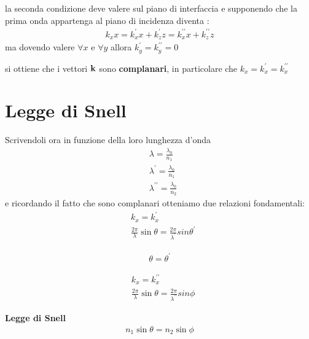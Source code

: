 la seconda condizione deve valere sul piano di interfaccia e supponendo che 
la prima onda appartenga al piano di incidenza diventa : 
\begin{align*}
        k_{x}x = k^{\prime}_{x}x + k^{\prime}_{z}z = k^{\prime\prime}_{x}x + k^{\prime\prime}_{z}z 
\end{align*}
ma dovendo valere $\forall{x}$ e $\forall{y}$ allora $k^{\prime}_{y} = k^{\prime\prime}_{y} = 0$
\begin{tcolorbox}[colback=red!5!white,colframe=red!50!black,title=ATTENZIONE !]
        si ottiene che i vettori $\vb{k}$ sono \textbf{complanari}, in particolare che 
        $k_{x} = k^{\prime}_{x} = k^{\prime\prime}_{x}$
\end{tcolorbox}
\section{Legge di Snell}
Scrivendoli ora in funzione della loro lunghezza d'onda
\begin{align*}
    &\lambda = \frac{\lambda_{0}}{n_{1}} \\
    &\lambda^{\prime} = \frac{\lambda_{0}}{n_{1}} \\
    &\lambda^{\prime\prime} = \frac{\lambda_{0}}{n_{2}}
\end{align*}
e ricordando il fatto che sono complanari otteniamo due relazioni fondamentali:
\begin{align*}
    &k_{x} = k^{\prime}_{x} \\
    &\frac{2\pi}{\lambda}\sin{\theta} = \frac{2\pi}{\lambda^{\prime}}sin{\theta^{\prime}}
\end{align*}
\begin{tcolorbox}[colback=red!5!white,colframe=red!50!black,title=ATTENZIONE !]
\begin{align*}
    \theta = \theta^{\prime}
\end{align*}
\end{tcolorbox}
\begin{align*}
    &k_{x} = k^{\prime\prime}_{x} \\
    &\frac{2\pi}{\lambda}\sin{\theta} = \frac{2\pi}{\lambda^{\prime\prime}}sin{\phi}
\end{align*}
\begin{tcolorbox}[colback=red!5!white,colframe=red!50!black,title=ATTENZIONE !]
        \textbf{Legge di Snell}
        \begin{align*}
            n_{1}\sin{\theta} = n_{2}\sin{\phi}
        \end{align*}
\end{tcolorbox}
